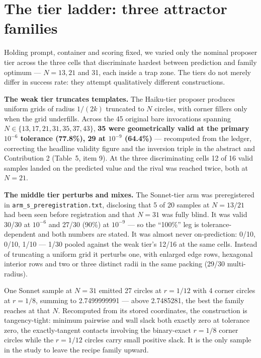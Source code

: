 \documentclass[11pt]{article}
\begin{document}
\section{The tier ladder: three attractor families}

Holding prompt, container and scoring fixed, we varied only the nominal proposer tier across
the three cells that discriminate hardest between prediction and family optimum --- $N = 13, 21$
and 31, each inside a trap zone. The tiers do not merely differ in success rate: they attempt
qualitatively different constructions.

\textbf{The weak tier truncates templates.} The Haiku-tier proposer produces uniform grids of radius
$1/(2k)$ truncated to $N$ circles, with corner fillers only when the grid underfills. Across the 45
original bare invocations spanning $N \in \{13, 17, 21, 31, 35, 37, 43\}$, \textbf{35 were geometrically
valid at the primary $10^{-6}$ tolerance (77.8\%), 29 at $10^{-9}$ (64.4\%)} --- recomputed from the ledger,
correcting the headline validity figure and the inversion triple in the abstract and
Contribution 2 (Table~5, item 9). At the three discriminating cells 12 of 16 valid samples
landed on the predicted value and the rival was reached twice, both at $N = 21$.

\textbf{The middle tier perturbs and mixes.} The Sonnet-tier arm was preregistered in
\texttt{arm\_s\_preregistration.txt}, disclosing that 5 of 20 samples at $N = 13/21$ had been seen before
registration and that $N = 31$ was fully blind. It was valid 30/30 at $10^{-6}$ and 27/30 (90\%) at
$10^{-9}$ --- so the ``100\%'' leg is tolerance-dependent and both numbers are stated. It was almost
never on-prediction: 0/10, 0/10, 1/10 --- 1/30 pooled against the weak tier's 12/16 at the same
cells. Instead of truncating a uniform grid it perturbs one, with enlarged edge rows, hexagonal
interior rows and two or three distinct radii in the same packing (29/30 multi-radius).

One Sonnet sample at $N = 31$ emitted 27 circles at $r = 1/12$ with 4 corner circles at $r = 1/8$,
summing to 2.7499999991 --- above 2.7485281, the best the family reaches at that $N$. Recomputed
from its stored coordinates, the construction is tangency-tight: minimum pairwise and wall slack
both exactly zero at tolerance zero, the exactly-tangent contacts involving the binary-exact
$r = 1/8$ corner circles while the $r = 1/12$ circles carry small positive slack. It is the only
sample in the study to leave the recipe family upward.
\end{document}
